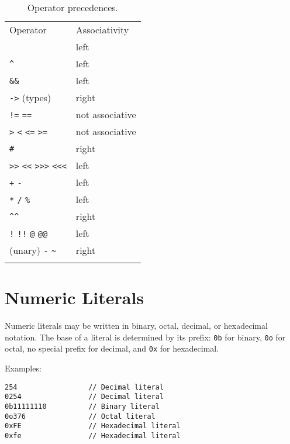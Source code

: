 \begin{longtable}[c]{@{}ll@{}}
\toprule\addlinespace
Operator & Associativity
\\\addlinespace
\midrule\endhead
\texttt{\textbar{}\textbar{}} & left
\\\addlinespace
\texttt{\^{}} & left
\\\addlinespace
\texttt{\&\&} & left
\\\addlinespace
\texttt{-\textgreater{}} (types) & right
\\\addlinespace
\texttt{!=} \texttt{==} & not associative
\\\addlinespace
\texttt{\textgreater{}} \texttt{\textless{}} \texttt{\textless{}=}
\texttt{\textgreater{}=} & not associative
\\\addlinespace
\texttt{\#} & right
\\\addlinespace
\texttt{\textgreater{}\textgreater{}} \texttt{\textless{}\textless{}}
\texttt{\textgreater{}\textgreater{}\textgreater{}}
\texttt{\textless{}\textless{}\textless{}} & left
\\\addlinespace
\texttt{+} \texttt{-} & left
\\\addlinespace
\texttt{*} \texttt{/} \texttt{\%} & left
\\\addlinespace
\texttt{\^{}\^{}} & right
\\\addlinespace
\texttt{!} \texttt{!!} \texttt{@} \texttt{@@} & left
\\\addlinespace
(unary) \texttt{-} \texttt{\textasciitilde{}} & right
\\\addlinespace
\bottomrule
\addlinespace
\caption{Operator precedences.}
\end{longtable}

\section{Numeric Literals}\label{numeric-literals}

Numeric literals may be written in binary, octal, decimal, or
hexadecimal notation. The base of a literal is determined by its prefix:
\texttt{0b} for binary, \texttt{0o} for octal, no special prefix for
decimal, and \texttt{0x} for hexadecimal.

Examples:

\begin{verbatim}
254                 // Decimal literal
0254                // Decimal literal
0b11111110          // Binary literal
0o376               // Octal literal
0xFE                // Hexadecimal literal
0xfe                // Hexadecimal literal
\end{verbatim}


